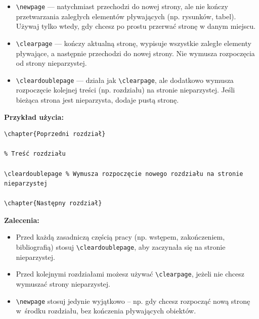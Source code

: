 \documentclass[12pt,a4paper,twoside]{report}
\theoremstyle{definition} %
\begin{document}
\begin{itemize}
  \item \texttt{\textbackslash newpage} — natychmiast przechodzi do nowej strony, ale nie kończy przetwarzania zaległych elementów pływających (np. rysunków, tabel). Używaj tylko wtedy, gdy chcesz po prostu przerwać stronę w danym miejscu.
  
  \item \texttt{\textbackslash clearpage} — kończy aktualną stronę, wypisuje wszystkie zaległe elementy pływające, a następnie przechodzi do nowej strony. Nie wymusza rozpoczęcia od strony nieparzystej.
  
  \item \texttt{\textbackslash cleardoublepage} — działa jak \texttt{\textbackslash clearpage}, ale dodatkowo wymusza rozpoczęcie kolejnej treści (np. rozdziału) na stronie nieparzystej. Jeśli bieżąca strona jest nieparzysta, dodaje pustą stronę.
\end{itemize}

\medskip

\textbf{Przykład użycia:}

\begin{verbatim}
\chapter{Poprzedni rozdział}

% Treść rozdziału

\cleardoublepage % Wymusza rozpoczęcie nowego rozdziału na stronie nieparzystej

\chapter{Następny rozdział}
\end{verbatim}

\medskip

\textbf{Zalecenia:}

\begin{itemize}
  \item Przed każdą zasadniczą częścią pracy (np. wstępem, zakończeniem, bibliografią) stosuj \texttt{\textbackslash cleardoublepage}, aby zaczynała się na stronie nieparzystej.
  \item Przed kolejnymi rozdziałami możesz używać \texttt{\textbackslash clearpage}, jeżeli nie chcesz wymuszać strony nieparzystej.
  \item \texttt{\textbackslash newpage} stosuj jedynie wyjątkowo – np. gdy chcesz rozpocząć nową stronę w~środku rozdziału, bez kończenia pływających obiektów.
\end{itemize}
\end{document}
